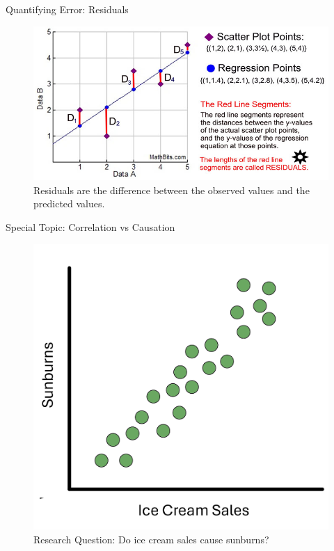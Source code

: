 \documentclass[
  ignorenonframetext,
]{beamer}
\begin{document}
\begin{frame}{Quantifying Error: Residuals}
\label{quantifying-error-residuals}
\begin{figure}[H]

{\centering \includegraphics{class31_files/mediabag/residuals-example.jpg}

}

\caption{Residuals are the difference between the observed values and
the predicted values.}

\end{figure}%
\end{frame}

\begin{frame}{Special Topic: Correlation vs Causation}
\label{special-topic-correlation-vs-causation}
\begin{figure}[H]

{\centering \includegraphics{class31_files/mediabag/ice-cream-sales.png}

}

\caption{Research Question: Do ice cream sales cause sunburns?}

\end{figure}%
\end{frame}
\end{document}
